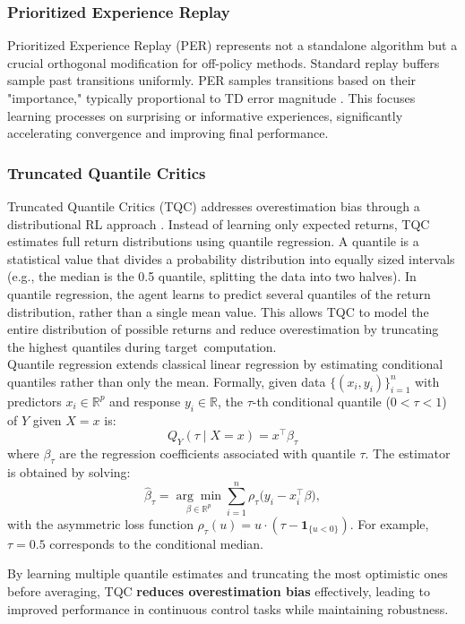 \subsubsection{Prioritized Experience Replay}

Prioritized Experience Replay (PER) represents not a standalone algorithm but a crucial orthogonal modification for off-policy methods. Standard replay buffers sample past transitions uniformly. PER samples transitions based on their "importance," typically proportional to TD error magnitude \cite{schaul2015prioritized}. This focuses learning processes on surprising or informative experiences, significantly accelerating convergence and improving final performance.


\subsubsection{Truncated Quantile Critics}
Truncated Quantile Critics (TQC)  addresses overestimation bias through a distributional RL approach \cite{kuznetsov2020controlling}. Instead of learning only expected returns, TQC estimates full return distributions using quantile regression.
A quantile is a statistical value that divides a probability distribution into equally sized intervals (e.g., the median is the 0.5 quantile, splitting the data into two halves).
In quantile regression, the agent learns to predict several quantiles of the return distribution, rather than a single mean value. This allows TQC to model the entire distribution of possible returns and reduce overestimation by truncating the highest quantiles during target computation.
\\
\noindent
Quantile regression extends classical linear regression by estimating conditional quantiles rather than only the mean. Formally, given data $\{(x_i, y_i)\}_{i=1}^n$ with predictors $x_i \in \mathbb{R}^p$ and response $y_i \in \mathbb{R}$, the $\tau$-th conditional quantile ($0 < \tau < 1$) of $Y$ given $X=x$ is:
\[
Q_Y(\tau \mid X=x) = x^\top \beta_\tau
\]
where $\beta_\tau$ are the regression coefficients associated with quantile $\tau$. The estimator is obtained by solving:
\[
\hat{\beta}_\tau = \underset{\beta \in \mathbb{R}^p}{\arg\min} 
\sum_{i=1}^n \rho_\tau \big( y_i - x_i^\top \beta \big),
\]
with the asymmetric loss function $\rho_\tau(u) = u \cdot (\tau - \mathbf{1}_{\{u < 0\}})$. For example, $\tau=0.5$ corresponds to the conditional median.

\noindent
By learning multiple quantile estimates and truncating the most optimistic ones before averaging, TQC \textbf{reduces overestimation bias} effectively, leading to improved performance in continuous control tasks while maintaining robustness.


